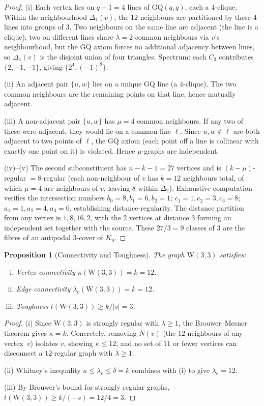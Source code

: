 \documentclass[12pt,a4paper]{article}
\newtheorem{proposition}[theorem]{Proposition}
\newcommand{\W}{\mathrm{W}(3,3)}
\begin{document}
\begin{proof}
(i) Each vertex lies on $q{+}1 = 4$ lines of GQ$(q,q)$, each a $4$-clique.
Within the neighbourhood $\Delta_1(v)$, the $12$ neighbours are partitioned
by these $4$ lines into groups of $3$.  Two neighbours on the same line
are adjacent (the line is a clique); two on different lines share
$\lambda = 2$ common neighbours via $v$'s neighbourhood, but the GQ axiom
forces no additional adjacency between lines, so $\Delta_1(v)$ is the
disjoint union of four triangles.  Spectrum: each $C_3$ contributes
$\{2, -1, -1\}$, giving $\{2^4, (-1)^8\}$.

(ii) An adjacent pair $\{u,w\}$ lies on a unique GQ line (a $4$-clique).
The two common neighbours are the remaining points on that line,
hence mutually adjacent.

(iii) A non-adjacent pair $\{u,w\}$ has $\mu = 4$ common neighbours.
If any two of these were adjacent, they would lie on a common line $\ell$.
Since $u,w \notin \ell$ are both adjacent to two points of $\ell$, the
GQ axiom (each point off a line is collinear with exactly one point on it)
is violated.  Hence $\mu$-graphs are independent.

(iv)--(v) The second subconstituent has $n - k - 1 = 27$ vertices and is
$(k - \mu)$-regular $= 8$-regular (each non-neighbour of $v$ has $k = 12$
neighbours total, of which $\mu = 4$ are neighbours of $v$, leaving $8$
within $\Delta_2$).  Exhaustive computation verifies the intersection
numbers $b_0 = 8, b_1 = 6, b_2 = 1$;
$c_1 = 1, c_2 = 3, c_3 = 8$;
$a_1 = 1, a_2 = 4, a_3 = 0$, establishing distance-regularity.
The distance partition from any vertex is $1, 8, 16, 2$, with the $2$
vertices at distance $3$ forming an independent set together with the
source.  These $27/3 = 9$ classes of $3$ are the fibres of an
antipodal $3$-cover of $K_9$.
\end{proof}


\begin{proposition}[Connectivity and Toughness]\label{prop:connectivity-tough}
The graph $\W$ satisfies:
\begin{enumerate}[(i)]
  \item Vertex connectivity $\kappa(\W) = k = 12$.
  \item Edge connectivity $\lambda_e(\W) = k = 12$.
  \item Toughness $t(\W) \ge k / |s| = 3$.
\end{enumerate}
\end{proposition}

\begin{proof}
(i) Since $\W$ is strongly regular with $\lambda \ge 1$,
the Brouwer--Mesner theorem gives $\kappa = k$.
Concretely, removing $N(v)$ (the $12$ neighbours of any vertex~$v$)
isolates $v$, showing $\kappa \le 12$, and no set of $11$ or fewer
vertices can disconnect a $12$-regular graph with $\lambda \ge 1$.

(ii) Whitney's inequality $\kappa \le \lambda_e \le \delta = k$
combines with (i) to give $\lambda_e = 12$.

(iii) By Brouwer's bound for strongly regular graphs,
$t(\W) \ge k / (-s) = 12/4 = 3$.
\end{proof}
\end{document}
